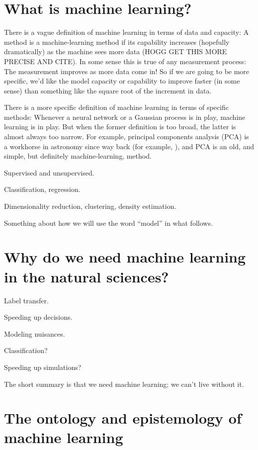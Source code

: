\documentclass[11pt]{article}
\begin{document}
\section{What is machine learning?}\label{sec:what}

There is a vague definition of machine learning in terms of data and capacity:
A method is a machine-learning method if its capability increases (hopefully dramatically) as the machine sees more data (HOGG GET THIS MORE PRECISE AND CITE).
In some sense this is true of any measurement process:
The measurement improves as more data come in!
So if we are going to be more specific, we'd like the model capacity or capability to improve faster (in some sense) than something like the square root of the increment in data.

There is a more specific definition of machine learning in terms of specific methods:
Whenever a neural network or a Gaussian process is in play, machine learning is in play.
But when the former definition is too broad, the latter is almost always too narrow.
For example, principal components analysis (PCA) is a workhorse in astronomy since way back (for example, \cite{pcaredshift}), and PCA is an old, and simple, but definitely machine-learning, method.

Supervised and unsupervised.

Classification, regression.

Dimensionality reduction, clustering, density estimation.

Something about how we will use the word ``model'' in what follows.

\section{Why do we need machine learning in the natural sciences?}

Label transfer.

Speeding up decisions.

Modeling nuisances.

Classification?

Speeding up simulations?

The short summary is that we need machine learning; we can't live without it.

\section{The ontology and epistemology of machine learning}
\end{document}
